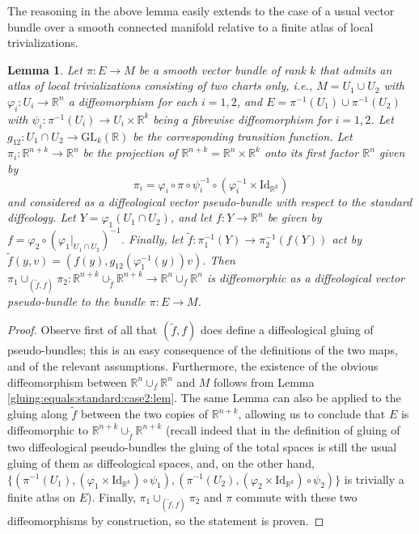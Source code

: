 \documentclass{article}
\newtheorem{lemma}{Lemma}[section]
\newcommand\matR{{\mathbb{R}}}
\begin{document}
The reasoning in the above lemma easily extends to the case of a usual vector bundle over a smooth connected manifold relative to a finite atlas of local trivializations. 

\begin{lemma}\label{gluing:equals:standard:bundle:case2:lem}
Let $\pi:E\to M$ be a smooth vector bundle of rank $k$ that admits an atlas of local trivializations consisting of two charts only, \emph{i.e.}, $M=U_1\cup U_2$ with $\varphi_i:U_i\to\matR^n$ a diffeomorphism 
for each $i=1,2$, and $E=\pi^{-1}(U_1)\cup\pi^{-1}(U_2)$ with $\psi_i:\pi^{-1}(U_i)\to U_i\times\matR^k$ being a fibrewise diffeomorphism for $i=1,2$. Let $g_{12}:U_1\cap U_2\to\mbox{GL}_k(\matR)$ be the 
corresponding transition function. Let $\pi_i:\matR^{n+k}\to\matR^n$ be the projection of $\matR^{n+k}=\matR^n\times\matR^k$ onto its first factor $\matR^n$ given by
$$\pi_i=\varphi_i\circ\pi\circ\psi_i^{-1}\circ(\varphi_i^{-1}\times\mbox{Id}_{\matR^k})$$ and considered as a diffeological vector pseudo-bundle with respect to the standard diffeology. Let 
$Y=\varphi_1(U_1\cap U_2)$, and let $f:Y\to\matR^n$ be given by $f=\varphi_2\circ(\varphi_1|_{U_1\cap U_2})^{-1}$. Finally, let $\tilde{f}:\pi_1^{-1}(Y)\to\pi_2^{-1}(f(Y))$ act by
$\tilde{f}(y,v)=(f(y),g_{12}(\varphi_1^{-1}(y))v)$. Then $\pi_1\cup_{(\tilde{f},f)}\pi_2:\matR^{n+k}\cup_{\tilde{f}}\matR^{n+k}\to\matR^n\cup_f\matR^n$ is diffeomorphic as a diffeological vector pseudo-bundle to 
the bundle $\pi:E\to M$.
\end{lemma}

\begin{proof}
Observe first of all that $(\tilde{f},f)$ does define a diffeological gluing of pseudo-bundles; this is an easy consequence of the definitions of the two maps, and of the relevant assumptions. Furthermore, the 
existence of the obvious diffeomorphism between $\matR^n\cup_f\matR^n$ and $M$ follows from Lemma \ref{gluing:equals:standard:case2:lem}. The same Lemma can also be applied to the gluing along 
$\tilde{f}$ between the two copies of $\matR^{n+k}$, allowing us to conclude that $E$ is diffeomorphic to $\matR^{n+k}\cup_{\tilde{f}}\matR^{n+k}$ (recall indeed that in the definition of gluing of two 
diffeological pseudo-bundles the gluing of the total spaces is still the usual gluing of them as diffeological spaces, and, on the other hand,
$\{(\pi^{-1}(U_1),(\varphi_1\times\mbox{Id}_{\matR^k})\circ\psi_1),(\pi^{-1}(U_2),(\varphi_2\times\mbox{Id}_{\matR^k})\circ\psi_2)\}$ is trivially a finite atlas on $E$). Finally, $\pi_1\cup_{(\tilde{f},f)}\pi_2$ and 
$\pi$ commute with these two diffeomorphisms by construction, so the statement is proven.
\end{proof}
\end{document}
